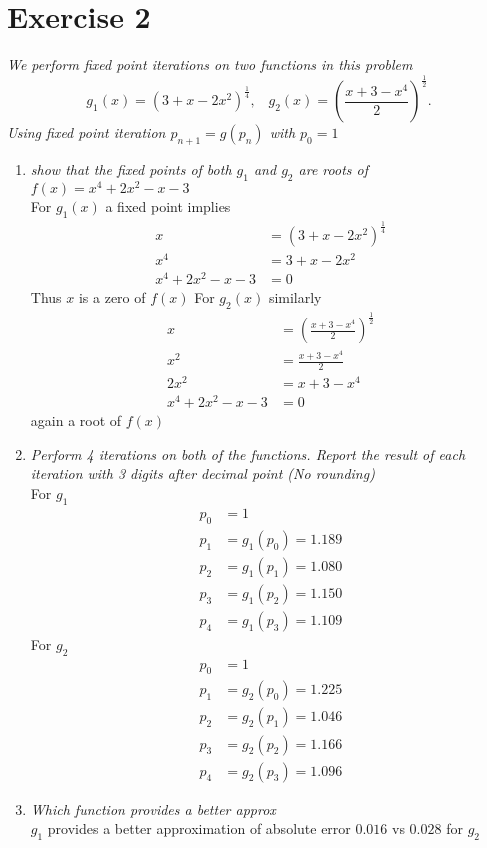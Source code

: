 \documentclass{amsart}
\begin{document}
    \section{Exercise 2}
    \emph{
        We perform fixed point iterations on two functions in this problem
        \[
        g_1(x) = (3+x-2x^2)^{\frac{1}{4}}, \;\;\; g_2(x) = (\frac{x+3-x^{4}}{2})^{\frac{1}{2}}
        .\] 
        Using fixed point iteration $p_{n+1} = g(p_n)$ with $p_0 = 1$
    }
    \begin{enumerate}
        \item \emph{show that the fixed points of both $g_1$ and $g_2$ are roots of $f(x) = x^{4}+2x^2-x-3$ }\\
            For $g_1(x)$ a fixed point implies
            \begin{align*}
                x &= (3+x-2x^2)^{\frac{1}{4}}\\
                x^{4} &= 3 + x - 2x^2\\
                x^{4}+2x^2-x-3 &= 0
            \end{align*}
            Thus $x$ is a zero of $f(x)$
            For  $g_2(x)$ similarly
            \begin{align*}
                x &= (\frac{x+3-x^{4}}{2})^{\frac{1}{2}}\\
                x^2 &= \frac{x+3-x^{4}}{2}\\
                2x^2 &= x+3 -x^{4}\\
                x^{4}+2x^2-x-3 &= 0
            \end{align*}
            again a root of $f(x)$
        \item \emph{Perform 4 iterations on both of the functions. Report the result of each
            iteration with 3 digits after decimal point (No rounding)}\\
            For $g_1$
             \begin{align*}
                 p_0 &= 1\\
                 p_1 &= g_1(p_0) = 1.189\\
                 p_2 &= g_1(p_1) = 1.080\\
                 p_3 &= g_1(p_2) = 1.150\\
                 p_4 &= g_1(p_3) = 1.109
            \end{align*}
            For $g_2$
            \begin{align*}
                p_0 &= 1\\
                p_1 &= g_2(p_0) = 1.225\\
                p_2 &= g_2(p_1) = 1.046\\
                p_3 &= g_2(p_2) = 1.166\\
                p_4 &= g_2(p_3) = 1.096
            \end{align*}
        \item \emph{Which function provides a better approx}\\
            $g_1$ provides a better approximation of absolute error  $0.016$ vs
            $0.028$ for $g_2$
    \end{enumerate}
\end{document}
